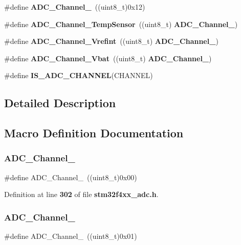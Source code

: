 \begin{DoxyCompactItemize}
\item 
\#define \textbf{ A\+D\+C\+\_\+\+Channel\+\_}~((uint8\+\_\+t)0x12)
\item 
\#define \textbf{ A\+D\+C\+\_\+\+Channel\+\_\+\+Temp\+Sensor}~((uint8\+\_\+t)\textbf{ A\+D\+C\+\_\+\+Channel\+\_})
\item 
\#define \textbf{ A\+D\+C\+\_\+\+Channel\+\_\+\+Vrefint}~((uint8\+\_\+t)\textbf{ A\+D\+C\+\_\+\+Channel\+\_})
\item 
\#define \textbf{ A\+D\+C\+\_\+\+Channel\+\_\+\+Vbat}~((uint8\+\_\+t)\textbf{ A\+D\+C\+\_\+\+Channel\+\_})
\item 
\#define \textbf{ I\+S\+\_\+\+A\+D\+C\+\_\+\+C\+H\+A\+N\+N\+EL}(C\+H\+A\+N\+N\+EL)
\end{DoxyCompactItemize}


\subsection{Detailed Description}


\subsection{Macro Definition Documentation}
\mbox{\label{group__ADC__channels_ga40ec353803e9470a5721ef5bf0b1ab24}} 
\subsubsection{A\+D\+C\+\_\+\+Channel\+\_}
{\footnotesize\ttfamily \#define A\+D\+C\+\_\+\+Channel\+\_~((uint8\+\_\+t)0x00)}



Definition at line \textbf{ 302} of file \textbf{ stm32f4xx\+\_\+adc.\+h}.

\mbox{\label{group__ADC__channels_ga0b04cebf8d62085eca6dc7daa3d5d3f0}} 
\subsubsection{A\+D\+C\+\_\+\+Channel\+\_}
{\footnotesize\ttfamily \#define A\+D\+C\+\_\+\+Channel\+\_~((uint8\+\_\+t)0x01)}



